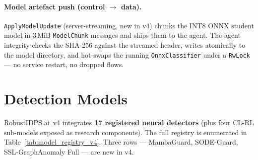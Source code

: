\documentclass[11pt,a4paper]{article}
\begin{document}
\paragraph{Model artefact push (control $\to$ data).}
\texttt{ApplyModelUpdate} (server-streaming, new in v4) chunks the
INT8 ONNX student model in 3\,MiB \texttt{ModelChunk} messages and
ships them to the agent.  The agent integrity-checks the SHA-256
against the streamed header, writes atomically to the model directory,
and hot-swaps the running \texttt{OnnxClassifier} under a
\texttt{RwLock} --- no service restart, no dropped flows.

\section{Detection Models}
\label{sec:models}

RobustIDPS.ai~v4 integrates \textbf{17 registered neural detectors}
(plus four CL-RL sub-models exposed as research components).  The
full registry is enumerated in Table~\ref{tab:model_registry_v4}.
Three rows --- MambaGuard, SODE-Guard, SSL-GraphAnomaly Full --- are
new in v4.
\end{document}
